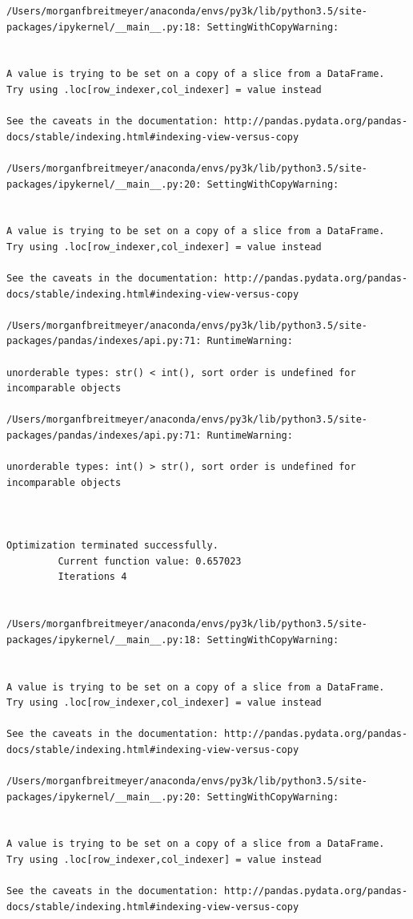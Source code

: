 \begin{lstlisting}
/Users/morganfbreitmeyer/anaconda/envs/py3k/lib/python3.5/site-packages/ipykernel/__main__.py:18: SettingWithCopyWarning:


A value is trying to be set on a copy of a slice from a DataFrame.
Try using .loc[row_indexer,col_indexer] = value instead

See the caveats in the documentation: http://pandas.pydata.org/pandas-docs/stable/indexing.html#indexing-view-versus-copy

/Users/morganfbreitmeyer/anaconda/envs/py3k/lib/python3.5/site-packages/ipykernel/__main__.py:20: SettingWithCopyWarning:


A value is trying to be set on a copy of a slice from a DataFrame.
Try using .loc[row_indexer,col_indexer] = value instead

See the caveats in the documentation: http://pandas.pydata.org/pandas-docs/stable/indexing.html#indexing-view-versus-copy

/Users/morganfbreitmeyer/anaconda/envs/py3k/lib/python3.5/site-packages/pandas/indexes/api.py:71: RuntimeWarning:

unorderable types: str() < int(), sort order is undefined for incomparable objects

/Users/morganfbreitmeyer/anaconda/envs/py3k/lib/python3.5/site-packages/pandas/indexes/api.py:71: RuntimeWarning:

unorderable types: int() > str(), sort order is undefined for incomparable objects



Optimization terminated successfully.
         Current function value: 0.657023
         Iterations 4


/Users/morganfbreitmeyer/anaconda/envs/py3k/lib/python3.5/site-packages/ipykernel/__main__.py:18: SettingWithCopyWarning:


A value is trying to be set on a copy of a slice from a DataFrame.
Try using .loc[row_indexer,col_indexer] = value instead

See the caveats in the documentation: http://pandas.pydata.org/pandas-docs/stable/indexing.html#indexing-view-versus-copy

/Users/morganfbreitmeyer/anaconda/envs/py3k/lib/python3.5/site-packages/ipykernel/__main__.py:20: SettingWithCopyWarning:


A value is trying to be set on a copy of a slice from a DataFrame.
Try using .loc[row_indexer,col_indexer] = value instead

See the caveats in the documentation: http://pandas.pydata.org/pandas-docs/stable/indexing.html#indexing-view-versus-copy


\end{lstlisting}
